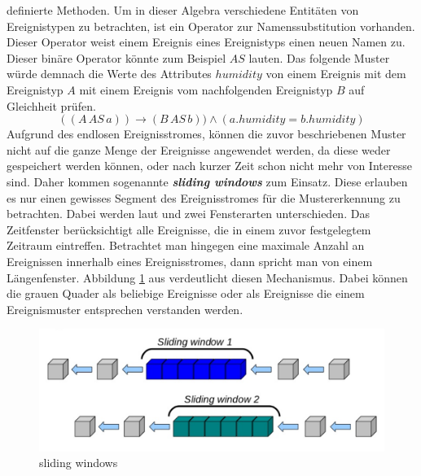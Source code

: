 \documentclass{acm_proc_article-sp}
\begin{document}
definierte Methoden. Um in dieser Algebra verschiedene Entitäten von Ereignistypen zu 
betrachten, ist ein Operator zur Namenssubstitution vorhanden. Dieser Operator weist 
einem Ereignis eines Ereignistyps einen neuen Namen zu. Dieser binäre Operator könnte zum 
Beispiel $AS$ lauten. Das folgende Muster würde demnach die Werte des Attributes 
$humidity$ von einem Ereignis mit dem Ereignistyp $A$ mit einem Ereignis vom 
nachfolgenden Ereignistyp $B$ auf Gleichheit prüfen.
$$((A\, AS\, a)) \rightarrow (B\, AS\, b)) \land (a.humidity = b.humidity)$$
Aufgrund des endlosen Ereignisstromes, können die zuvor beschriebenen Muster nicht auf 
die ganze Menge der Ereignisse angewendet werden, da diese weder gespeichert werden 
können, oder nach kurzer Zeit schon nicht mehr von Interesse sind. Daher kommen 
sogenannte \textbf{\textit{sliding windows}} zum Einsatz. Diese erlauben es nur einen 
gewisses Segment des Ereignisstromes für die Mustererkennung zu betrachten. Dabei werden 
laut \cite{bruns} und \cite{hedtstuck} zwei Fensterarten unterschieden. Das Zeitfenster 
berücksichtigt alle Ereignisse, die in einem zuvor festgelegtem Zeitraum eintreffen. 
Betrachtet man hingegen eine maximale Anzahl an Ereignissen innerhalb eines 
Ereignisstromes, dann spricht man von einem Längenfenster. Abbildung 
\ref{img:sliding-windows} aus \cite{drools-slide} verdeutlicht diesen Mechanismus. Dabei 
können die grauen Quader als beliebige Ereignisse oder als Ereignisse die einem 
Ereignismuster entsprechen verstanden werden.

\begin{figure}[H]
    \centering
    \includegraphics[width=\linewidth]{img/sliding-windows.png}
    \caption{sliding windows}
    \label{img:sliding-windows}
\end{figure}
\end{document}

